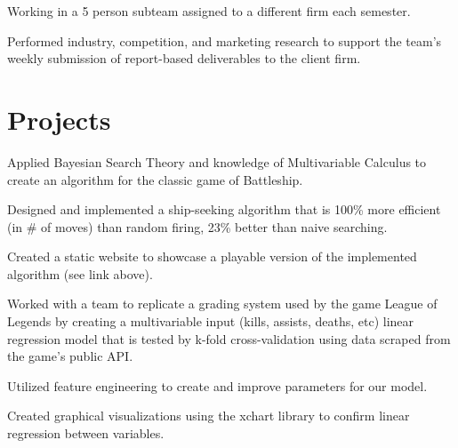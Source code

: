 \documentclass[]{deedy-resume-openfont}
\begin{document}
\begin{minipage}[t]{0.66\textwidth}
\begin{tightemize}
\item Working in a 5 person subteam assigned to a different firm each semester.
\item Performed industry, competition, and marketing research to support the team's weekly submission of report-based deliverables to the client firm.
\end{tightemize}
\sectionsep


\section{Projects}
\begin{tightemize}
\item Applied Bayesian Search Theory and knowledge of Multivariable Calculus to create an algorithm for the classic game of Battleship. 
\item Designed and implemented a ship-seeking algorithm that is 100\% more efficient (in \# of moves) than random firing, 23\% better than naive searching.
\item Created a static website to showcase a playable version of the implemented algorithm (see link above).
\end{tightemize}

\sectionsep
{}
\sectionsep



\begin{tightemize}
\item Worked with a team to replicate a grading system used by the game League of Legends by creating a multivariable input (kills, assists, deaths, etc) linear regression model that is tested by k-fold cross-validation using data scraped from the game's public API.
\item Utilized feature engineering to create and improve parameters for our model.
\item Created graphical visualizations using the xchart library to confirm linear regression between variables.
\end{tightemize}
\sectionsep



\end{minipage}
\end{document}
